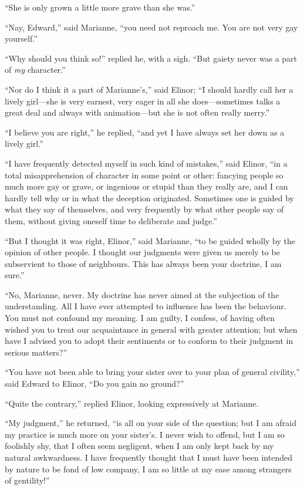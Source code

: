 ``She is only grown a little more grave than she was.''

``Nay, Edward,'' said Marianne, ``you need not reproach me.
You are not very gay yourself.''

``Why should you think so!'' replied he, with a sigh.
``But gaiety never was a part of \emph{my} character.''

``Nor do I think it a part of Marianne's,'' said Elinor;
``I should hardly call her a lively girl---she is very earnest,
very eager in all she does---sometimes talks a great deal
and always with animation---but she is not often really merry.''

``I believe you are right,'' he replied, ``and yet I
have always set her down as a lively girl.''

``I have frequently detected myself in such kind of mistakes,''
said Elinor, ``in a total misapprehension of character in some
point or other: fancying people so much more gay or grave,
or ingenious or stupid than they really are, and I can
hardly tell why or in what the deception originated.
Sometimes one is guided by what they say of themselves,
and very frequently by what other people say of them,
without giving oneself time to deliberate and judge.''

``But I thought it was right, Elinor,'' said Marianne,
``to be guided wholly by the opinion of other people.
I thought our judgments were given us merely to be subservient
to those of neighbours.  This has always been your doctrine,
I am sure.''

``No, Marianne, never.  My doctrine has never aimed
at the subjection of the understanding.  All I have
ever attempted to influence has been the behaviour.
You must not confound my meaning.  I am guilty, I confess,
of having often wished you to treat our acquaintance
in general with greater attention; but when have I advised
you to adopt their sentiments or to conform to their
judgment in serious matters?''

``You have not been able to bring your sister over to your
plan of general civility,'' said Edward to Elinor, ``Do you gain
no ground?''

``Quite the contrary,'' replied Elinor,
looking expressively at Marianne.

``My judgment,'' he returned, ``is all on your side
of the question; but I am afraid my practice is much
more on your sister's.  I never wish to offend, but I
am so foolishly shy, that I often seem negligent,
when I am only kept back by my natural awkwardness.
I have frequently thought that I must have been intended
by nature to be fond of low company, I am so little at
my ease among strangers of gentility!''

